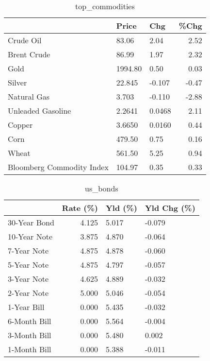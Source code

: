 \documentclass{article}%
\begin{document}
\begin{table}[htbp]%
\caption{top\_commodities}%
\centering%
\begin{adjustbox}{width=1\textwidth}%
\begin{tabular}{lllr}
\toprule
                          &   Price &    Chg &  \%Chg \\
\midrule
               Crude Oil  &   83.06 &   2.04 &  2.52 \\
             Brent Crude  &   86.99 &   1.97 &  2.32 \\
                    Gold  & 1994.80 &   0.50 &  0.03 \\
                  Silver  &  22.845 & -0.107 & -0.47 \\
             Natural Gas  &   3.703 & -0.110 & -2.88 \\
       Unleaded Gasoline  &  2.2641 & 0.0468 &  2.11 \\
                  Copper  &  3.6650 & 0.0160 &  0.44 \\
                    Corn  &  479.50 &   0.75 &  0.16 \\
                   Wheat  &  561.50 &   5.25 &  0.94 \\
Bloomberg Commodity Index &  104.97 &   0.35 &  0.33 \\
\bottomrule
\end{tabular}
%
\end{adjustbox}%
\end{table}

%


\begin{table}[htbp]%
\caption{us\_bonds}%
\centering%
\begin{adjustbox}{width=1\textwidth}%
\begin{tabular}{lrll}
\toprule
             &  Rate (\%) & Yld (\%) & Yld Chg (\%) \\
\midrule
30-Year Bond &     4.125 &   5.017 &      -0.079 \\
10-Year Note &     3.875 &   4.870 &      -0.064 \\
 7-Year Note &     4.875 &   4.878 &      -0.060 \\
 5-Year Note &     4.875 &   4.797 &      -0.057 \\
 3-Year Note &     4.625 &   4.889 &      -0.032 \\
 2-Year Note &     5.000 &   5.046 &      -0.054 \\
 1-Year Bill &     0.000 &   5.435 &      -0.032 \\
6-Month Bill &     0.000 &   5.564 &      -0.004 \\
3-Month Bill &     0.000 &   5.480 &       0.002 \\
1-Month Bill &     0.000 &   5.388 &      -0.011 \\
\bottomrule
\end{tabular}
%
\end{adjustbox}%
\end{table}
\end{document}
